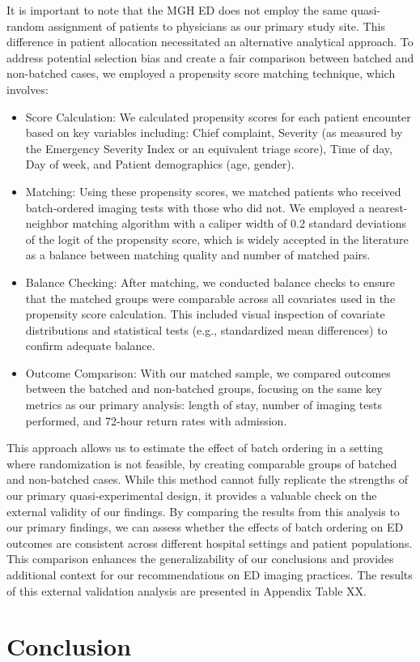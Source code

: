 \documentclass{article}
\begin{document}
It is important to note that the MGH ED does not employ the same
quasi-random assignment of patients to physicians as our primary study
site. This difference in patient allocation necessitated an alternative
analytical approach. To address potential selection bias and create a
fair comparison between batched and non-batched cases, we employed a
propensity score matching technique, which involves:

\begin{itemize}
\item
  Score Calculation: We calculated propensity scores for each patient
  encounter based on key variables including: Chief complaint, Severity
  (as measured by the Emergency Severity Index or an equivalent triage
  score), Time of day, Day of week, and Patient demographics (age,
  gender).
\item
  Matching: Using these propensity scores, we matched patients who
  received batch-ordered imaging tests with those who did not. We
  employed a nearest-neighbor matching algorithm with a caliper width of
  0.2 standard deviations of the logit of the propensity score, which is
  widely accepted in the literature as a balance between matching
  quality and number of matched pairs.
\item
  Balance Checking: After matching, we conducted balance checks to
  ensure that the matched groups were comparable across all covariates
  used in the propensity score calculation. This included visual
  inspection of covariate distributions and statistical tests (e.g.,
  standardized mean differences) to confirm adequate balance.
\item
  Outcome Comparison: With our matched sample, we compared outcomes
  between the batched and non-batched groups, focusing on the same key
  metrics as our primary analysis: length of stay, number of imaging
  tests performed, and 72-hour return rates with admission.
\end{itemize}

This approach allows us to estimate the effect of batch ordering in a
setting where randomization is not feasible, by creating comparable
groups of batched and non-batched cases. While this method cannot fully
replicate the strengths of our primary quasi-experimental design, it
provides a valuable check on the external validity of our findings. By
comparing the results from this analysis to our primary findings, we can
assess whether the effects of batch ordering on ED outcomes are
consistent across different hospital settings and patient populations.
This comparison enhances the generalizability of our conclusions and
provides additional context for our recommendations on ED imaging
practices. The results of this external validation analysis are
presented in Appendix Table XX.

\hypertarget{conclusion}{%
\section{Conclusion}\label{conclusion}}



\end{document}
